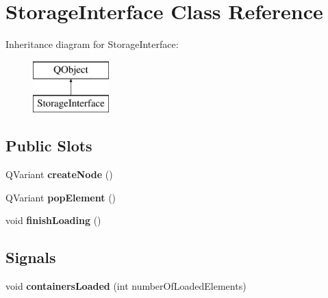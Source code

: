 \hypertarget{classStorageInterface}{}\section{Storage\+Interface Class Reference}
\label{classStorageInterface}
Inheritance diagram for Storage\+Interface\+:\begin{figure}[H]
\begin{center}
\leavevmode
\includegraphics[height=2.000000cm]{classStorageInterface}
\end{center}
\end{figure}
\subsection*{Public Slots}
\begin{DoxyCompactItemize}
\item 
\mbox{\label{classStorageInterface_a92a1fdb2cb4576b31fa236f8e2020f73}} 
Q\+Variant {\bfseries create\+Node} ()
\item 
\mbox{\label{classStorageInterface_a48970a8eb1a4ddba216df0f628f48347}} 
Q\+Variant {\bfseries pop\+Element} ()
\item 
\mbox{\label{classStorageInterface_aaa04b04a58411bbb50cff07b6d4b2d21}} 
void {\bfseries finish\+Loading} ()
\end{DoxyCompactItemize}
\subsection*{Signals}
\begin{DoxyCompactItemize}
\item 
\mbox{\label{classStorageInterface_adab2ae35804274ef3773e27757081ffa}} 
void {\bfseries containers\+Loaded} (int number\+Of\+Loaded\+Elements)
\end{DoxyCompactItemize}
